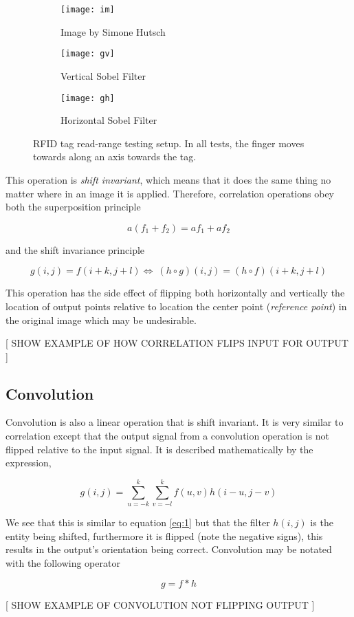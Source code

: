 \begin{figure}[htbp]
  \centering
  \begin{subfigure}[b]{0.3\textwidth}
      \texttt{[image: im]}
      \caption{Image by Simone Hutsch}
      \label{rfidtest_xaxis}
  \end{subfigure}
  \begin{subfigure}[b]{0.3\textwidth}
      \texttt{[image: gv]}
      \caption{Vertical Sobel Filter}
      \label{rfidtest_yaxis}
  \end{subfigure}
  \begin{subfigure}[b]{0.3\textwidth}
      \texttt{[image: gh]}
      \caption{Horizontal Sobel Filter}
      \label{rfidtest_zaxis}
  \end{subfigure}
  \caption[RFID tag read-range testing]{RFID tag read-range testing setup. In all tests, the finger moves towards along an axis towards the tag.}
  \label{rfidtag_testing}
\end{figure}

This operation is \emph{shift invariant}, which means that it does the same thing no matter where in an image it is applied. Therefore, correlation operations obey both the superposition principle

\[a(f_1 + f_2) = af_1 + af_2\]

and the shift invariance principle

\[g(i,j)=f(i+k,j+l) \Leftrightarrow\ (h\circ g)(i,j)=(h\circ f)(i+k,j+l)\]

This operation has the side effect of flipping both horizontally and vertically the location of output points relative to location the center point (\emph{reference point}) in the original image which may be undesirable.

[ SHOW EXAMPLE OF HOW CORRELATION FLIPS INPUT FOR OUTPUT ]

\subsection{Convolution}

Convolution is also a linear operation that is shift invariant. It is very similar to correlation except that the output signal from a convolution operation is not flipped relative to the input signal. It is described mathematically by the expression,

\[ g(i,j) = \sum_{u=-k}^{k}\sum_{v = -l}^{k}f(u,v)h(i-u,j-v)\]

We see that this is similar to equation \ref{eq:1} but that the filter $h(i,j)$ is the entity being shifted, furthermore it is flipped (note the negative signs), this results in the output's orientation being correct. Convolution may be notated with the following operator

\[g = f \ast h\]

[ SHOW EXAMPLE OF CONVOLUTION NOT FLIPPING OUTPUT ]
